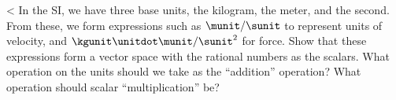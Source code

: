 <%
In the SI, we have three base units, the kilogram, the meter, and the second.
From these, we form expressions such as $\munit/\sunit$ to represent units
of velocity, and $\kgunit\unitdot\munit/\sunit^2$ for force. Show that these
expressions form a vector space with the rational numbers as the scalars.
What operation on the units should we take as the ``addition'' operation?
What operation should scalar ``multiplication'' be?
